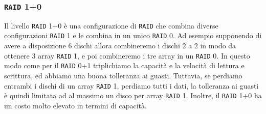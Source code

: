     \subsubsection{\texttt{RAID} 1+0}
        Il livello \texttt{RAID} 1+0 è una configurazione di \texttt{RAID} che combina diverse configurazioni \texttt{RAID} 1 e le combina in un unico \texttt{RAID} 0. Ad esempio supponendo di avere a disposizione $6$ dischi allora combineremo i dischi $2$ a $2$ in modo da ottenere $3$ array \texttt{RAID} 1, e poi combineremo i tre array in un \texttt{RAID} 0. In questo modo come per il \texttt{RAID} 0+1 triplichiamo la capacità e la velocità di lettura e scrittura, ed abbiamo una buona tolleranza ai guasti. Tuttavia, se perdiamo entrambi i dischi di un array \texttt{RAID} 1, perdiamo tutti i dati, la tolleranza ai guasti è quindi limitata ad al massimo un disco per array \texttt{RAID} 1. Inoltre, il \texttt{RAID} 1+0 ha un costo molto elevato in termini di capacità.